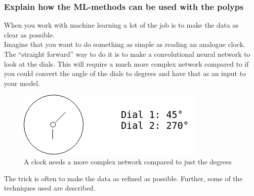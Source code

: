 



















































































\iffalse
\subsubsection{Explain how the ML-methods can be used with the polyps}
When you work with machine learning a lot of the job is to make the data as clear as possible. \\
Imagine that you want to do something as simple as reading an analogue clock. The ``straight forward'' way to do it is to make a convolutional neural network to look at the dials. This will require a much more complex network compared to if you could convert the angle of the dials to degrees and have that as an input to your model.

    \begin{figure}[ht]
      \centering
      \includegraphics[scale=0.5]{methods/figures/Clock.png}
      \caption{A clock needs a more complex network compared to just the degrees}
    \end{figure}
    The trick is often to make the data as refined as possible. 
    Further, some of the techniques used are described.
    



